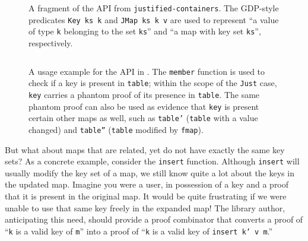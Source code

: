 \documentclass[format=sigplan, review=false, screen=true, 10pt]{acmart}
\makeatletter
\let\origsubsection\subsection
\renewcommand\subsection{\@ifstar{\starsubsection}{\nostarsubsection}}
\newcommand\nostarsubsection[1]
{\subsectionprelude\origsubsection{#1}\subsectionpostlude}
\newcommand\starsubsection[1]
{\subsectionprelude\origsubsection*{#1}\subsectionpostlude}
\newcommand\subsectionprelude{%
  \vspace{-0.25em}
}
\newcommand\subsectionpostlude{%
  \vspace{-0.05em}
}
\makeatother
\begin{document}
\begin{figure}
  \inputminted{haskell}{justified.hs}
  \caption{A fragment of the API from \texttt{justified-containers}.
    The GDP-style predicates \texttt{Key ks k} and \texttt{JMap ks k v} are used to represent
    ``a value of type \texttt{k} belonging to the set \texttt{ks}'' and ``a map with key set \texttt{ks}'',
    respectively. \label{justified-api}}
\end{figure}
\begin{figure}
  \inputminted{haskell}{justified-usage.hs}
  \caption{A usage example for the API in . The \texttt{member} function is used
    to check if a key is present in \texttt{table}; within the scope of the \texttt{Just} case, \texttt{key}
    carries a phantom proof of its presence in \texttt{table}. The same phantom proof can also be used as evidence that
    \texttt{key} is present certain other maps as well, such as \texttt{table'} (\texttt{table} with a
    value changed) and \texttt{table''} (\texttt{table} modified by \texttt{fmap}).\label{justified-usage}} 
\end{figure}


\subsection{Changing the key set}\label{changing-keys}
But what about maps that are related, yet do not have exactly the same key sets?
As a concrete example, consider the \texttt{insert} function. Although \texttt{insert} will usually
modify the key set of a map, we still know quite a lot about the keys in the updated map.
 Imagine you were a user, in possession of a key and a proof
that it is present in the original map. It would be quite frustrating if  we were
unable to use that same key freely in the expanded map!
The library author, anticipating this need, should provide a proof combinator that
converts a proof of ``\texttt{k} is a valid key of \texttt{m}'' into a proof of
``\texttt{k} is a valid key of \texttt{insert k' v m}.''
\end{document}
